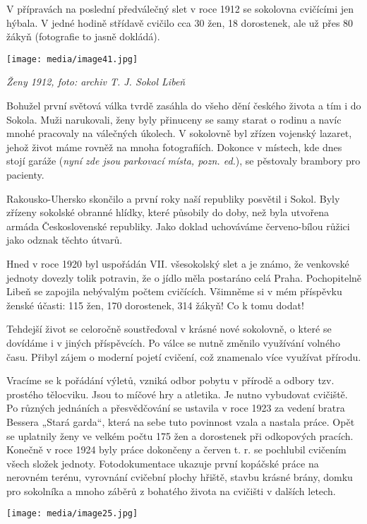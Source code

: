 V přípravách na poslední předválečný slet v roce 1912 se sokolovna
cvičícími jen hýbala. V jedné hodině střídavě cvičilo cca 30 žen, 18
dorostenek, ale už přes 80 žákyň (fotografie to jasně dokládá).

\texttt{[image: media/image41.jpg]}

\emph{Ženy 1912, foto: archiv T. J. Sokol Libeň}

Bohužel první světová válka tvrdě zasáhla do všeho dění českého života a
tím i do Sokola. Muži narukovali, ženy byly přinuceny se samy starat o
rodinu a navíc mnohé pracovaly na válečných úkolech. V sokolovně byl
zřízen vojenský lazaret, jehož život máme rovněž na mnoha fotografiích.
Dokonce v místech, kde dnes stojí garáže (\emph{nyní zde jsou parkovací
místa, pozn. ed.}), se pěstovaly brambory pro pacienty.

Rakousko-Uhersko skončilo a první roky naší republiky posvětil i Sokol.
Byly zřízeny sokolské obranné hlídky, které působily do doby, než byla
utvořena armáda Československé republiky. Jako doklad uchováváme
červeno-bílou růžici jako odznak těchto útvarů.

Hned v roce 1920 byl uspořádán VII. všesokolský slet a je známo, že
venkovské jednoty dovezly tolik potravin, že o jídlo měla postaráno celá
Praha. Pochopitelně Libeň se zapojila nebývalým počtem cvičících.
Všimněme si v mém příspěvku ženské účasti: 115 žen, 170 dorostenek, 314
žákyň! Co k tomu dodat!

Tehdejší život se celoročně soustřeďoval v krásné nové sokolovně, o
které se dovídáme i v jiných příspěvcích. Po válce se nutně změnilo
využívání volného času. Přibyl zájem o moderní pojetí cvičení, což
znamenalo více využívat přírodu.

Vracíme se k pořádání výletů, vzniká odbor pobytu v přírodě a odbory
tzv. prostého tělocviku. Jsou to míčové hry a atletika. Je nutno
vybudovat cvičiště. Po různých jednáních a přesvědčování se ustavila v
roce 1923 za vedení bratra Bessera „Stará garda``, která na sebe tuto
povinnost vzala a nastala práce. Opět se uplatnily ženy ve velkém počtu
175 žen a dorostenek při odkopových pracích. Konečně v roce 1924 byly
práce dokončeny a červen t. r. se pochlubil cvičením všech složek
jednoty. Fotodokumentace ukazuje první kopáčské práce na nerovném
terénu, vyrovnání cvičební plochy hřiště, stavbu krásné brány, domku pro
sokolníka a mnoho záběrů z bohatého života na cvičišti v dalších letech.

\texttt{[image: media/image25.jpg]}

